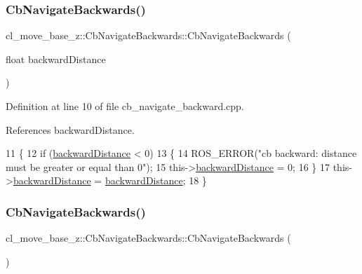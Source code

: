 \subsubsection{\texorpdfstring{Cb\+Navigate\+Backwards()}{CbNavigateBackwards()}\hspace{0.1cm}{\footnotesize\ttfamily [1/2]}}
{\footnotesize\ttfamily cl\+\_\+move\+\_\+base\+\_\+z\+::\+Cb\+Navigate\+Backwards\+::\+Cb\+Navigate\+Backwards (\begin{DoxyParamCaption}\item[{float}]{backward\+Distance }\end{DoxyParamCaption})}



Definition at line 10 of file cb\+\_\+navigate\+\_\+backward.\+cpp.



References backward\+Distance.


\begin{DoxyCode}
11     \{
12         \textcolor{keywordflow}{if} (\hyperlink{classcl__move__base__z_1_1CbNavigateBackwards_abb7099e4e18602f6cf06c4f5534a2a15}{backwardDistance} < 0)
13         \{
14             ROS\_ERROR(\textcolor{stringliteral}{"cb backward: distance must be greater or equal than 0"});
15             this->\hyperlink{classcl__move__base__z_1_1CbNavigateBackwards_abb7099e4e18602f6cf06c4f5534a2a15}{backwardDistance} = 0;
16         \}
17         this->\hyperlink{classcl__move__base__z_1_1CbNavigateBackwards_abb7099e4e18602f6cf06c4f5534a2a15}{backwardDistance} = \hyperlink{classcl__move__base__z_1_1CbNavigateBackwards_abb7099e4e18602f6cf06c4f5534a2a15}{backwardDistance};
18     \}
\end{DoxyCode}
\mbox{\label{classcl__move__base__z_1_1CbNavigateBackwards_a1329e851a242a12e80c6364c02651b70}} 
\subsubsection{\texorpdfstring{Cb\+Navigate\+Backwards()}{CbNavigateBackwards()}\hspace{0.1cm}{\footnotesize\ttfamily [2/2]}}
{\footnotesize\ttfamily cl\+\_\+move\+\_\+base\+\_\+z\+::\+Cb\+Navigate\+Backwards\+::\+Cb\+Navigate\+Backwards (\begin{DoxyParamCaption}{ }\end{DoxyParamCaption})}



